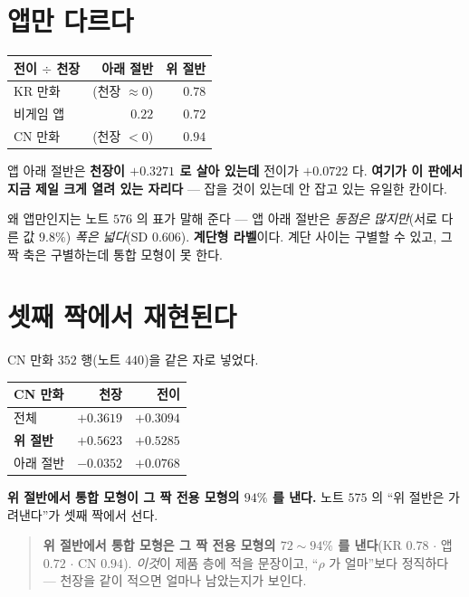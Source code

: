 \documentclass[11pt]{article}
\begin{document}
\section{앱만 다르다}

\begin{center}
\begin{tabular}{lrr}
\hline
전이 $\div$ 천장 & 아래 절반 & 위 절반 \\
\hline
KR 만화 & (천장 $\approx 0$) & $0.78$ \\
비게임 앱 & $\mathbf{0.22}$ & $0.72$ \\
CN 만화 & (천장 $< 0$) & $\mathbf{0.94}$ \\
\hline
\end{tabular}
\end{center}

앱 아래 절반은 \textbf{천장이 $+0.3271$ 로 살아 있는데} 전이가 $+0.0722$
다. \textbf{여기가 이 판에서 지금 제일 크게 열려 있는 자리다} --- 잡을 것이
있는데 안 잡고 있는 유일한 칸이다.

왜 앱만인지는 노트 $576$ 의 표가 말해 준다 --- 앱 아래 절반은 \emph{동점은
많지만}(서로 다른 값 $9.8\%$) \emph{폭은 넓다}(SD $0.606$). \textbf{계단형
라벨}이다. 계단 사이는 구별할 수 있고, 그 짝 축은 구별하는데 통합 모형이
못 한다.

\section{셋째 짝에서 재현된다}

CN 만화 $352$ 행(노트 $440$)을 같은 자로 넣었다.

\begin{center}
\begin{tabular}{lrr}
\hline
CN 만화 & 천장 & 전이 \\
\hline
전체 & $+0.3619$ & $+0.3094$ \\
\textbf{위 절반} & $+0.5623$ & $\mathbf{+0.5285}$ \\
아래 절반 & $-0.0352$ & $+0.0768$ \\
\hline
\end{tabular}
\end{center}

\textbf{위 절반에서 통합 모형이 그 짝 전용 모형의 $94\%$ 를 낸다.}
노트 $575$ 의 ``위 절반은 가려낸다''가 셋째 짝에서 선다.

\begin{quote}
\textbf{위 절반에서 통합 모형은 그 짝 전용 모형의 $72\!\sim\!94\%$ 를
낸다}(KR $0.78$ $\cdot$ 앱 $0.72$ $\cdot$ CN $0.94$). \emph{이것}이
제품 층에 적을 문장이고, ``$\rho$ 가 얼마''보다 정직하다 --- 천장을
같이 적으면 얼마나 남았는지가 보인다.
\end{quote}
\end{document}
